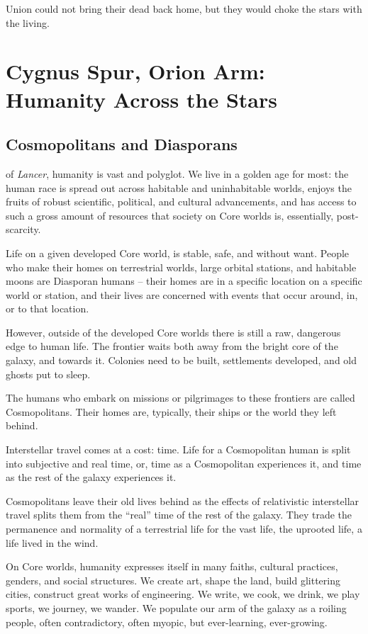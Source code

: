 Union could not bring their dead back home, but they would choke the stars with the living.

\section{Cygnus Spur, Orion Arm: Humanity Across the Stars}

\subsection{Cosmopolitans and Diasporans}

 of \textit{Lancer}, humanity is vast and polyglot. We live in a golden age
for most: the human race is spread out across habitable and uninhabitable worlds, enjoys the
fruits of robust scientific, political, and cultural advancements, and has access to such a gross
amount of resources that society on Core worlds is, essentially, post-scarcity.

Life on a given developed Core world, is stable, safe, and without want. People who make their
homes on terrestrial worlds, large orbital stations, and habitable moons are Diasporan humans --
their homes are in a specific location on a specific world or station, and their lives are concerned
with events that occur around, in, or to that location.

However, outside of the developed Core worlds there is still a raw, dangerous edge to human life.
The frontier waits both away from the bright core of the galaxy, and towards it. Colonies need to
be built, settlements developed, and old ghosts put to sleep.

The humans who embark on missions or pilgrimages to these frontiers are called Cosmopolitans.
Their homes are, typically, their ships or the world they left behind.

Interstellar travel comes at a cost: time. Life for a Cosmopolitan human is split into subjective
and real time, or, time as a Cosmopolitan experiences it, and time as the rest of the galaxy
experiences it.

Cosmopolitans leave their old lives behind as the effects of relativistic interstellar travel splits
them from the ``real'' time of the rest of the galaxy. They trade the permanence and normality of a
terrestrial life for the vast life, the uprooted life, a life lived in the wind.

On Core worlds, humanity expresses itself in many faiths, cultural practices, genders, and social
structures. We create art, shape the land, build glittering cities, construct great works of
engineering. We write, we cook, we drink, we play sports, we journey, we wander. We populate
our arm of the galaxy as a roiling people, often contradictory, often myopic, but ever-learning,
ever-growing.

